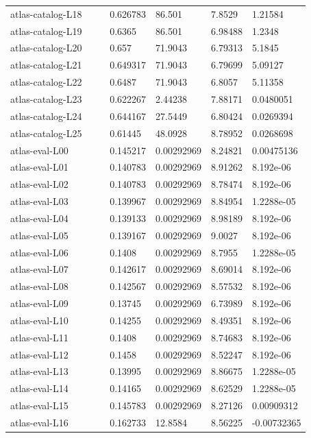 \begin{longtable}{@{}L{0.39\linewidth}L{0.11\linewidth}L{0.12\linewidth}L{0.12\linewidth}L{0.13\linewidth}@{}}
atlas-catalog-L18 & 0.626783 & 86.501 & 7.8529 & 1.21584 \\
atlas-catalog-L19 & 0.6365 & 86.501 & 6.98488 & 1.2348 \\
atlas-catalog-L20 & 0.657 & 71.9043 & 6.79313 & 5.1845 \\
atlas-catalog-L21 & 0.649317 & 71.9043 & 6.79699 & 5.09127 \\
atlas-catalog-L22 & 0.6487 & 71.9043 & 6.8057 & 5.11358 \\
atlas-catalog-L23 & 0.622267 & 2.44238 & 7.88171 & 0.0480051 \\
atlas-catalog-L24 & 0.644167 & 27.5449 & 6.80424 & 0.0269394 \\
atlas-catalog-L25 & 0.61445 & 48.0928 & 8.78952 & 0.0268698 \\
atlas-eval-L00 & 0.145217 & 0.00292969 & 8.24821 & 0.00475136 \\
atlas-eval-L01 & 0.140783 & 0.00292969 & 8.91262 & \mbox{8.192e-06} \\
atlas-eval-L02 & 0.140783 & 0.00292969 & 8.78474 & \mbox{8.192e-06} \\
atlas-eval-L03 & 0.139967 & 0.00292969 & 8.84954 & \mbox{1.2288e-05} \\
atlas-eval-L04 & 0.139133 & 0.00292969 & 8.98189 & \mbox{8.192e-06} \\
atlas-eval-L05 & 0.139167 & 0.00292969 & 9.0027 & \mbox{8.192e-06} \\
atlas-eval-L06 & 0.1408 & 0.00292969 & 8.7955 & \mbox{1.2288e-05} \\
atlas-eval-L07 & 0.142617 & 0.00292969 & 8.69014 & \mbox{8.192e-06} \\
atlas-eval-L08 & 0.142567 & 0.00292969 & 8.57532 & \mbox{8.192e-06} \\
atlas-eval-L09 & 0.13745 & 0.00292969 & 6.73989 & \mbox{8.192e-06} \\
atlas-eval-L10 & 0.14255 & 0.00292969 & 8.49351 & \mbox{8.192e-06} \\
atlas-eval-L11 & 0.1408 & 0.00292969 & 8.74683 & \mbox{8.192e-06} \\
atlas-eval-L12 & 0.1458 & 0.00292969 & 8.52247 & \mbox{8.192e-06} \\
atlas-eval-L13 & 0.13995 & 0.00292969 & 8.86675 & \mbox{1.2288e-05} \\
atlas-eval-L14 & 0.14165 & 0.00292969 & 8.62529 & \mbox{1.2288e-05} \\
atlas-eval-L15 & 0.145783 & 0.00292969 & 8.27126 & 0.00909312 \\
atlas-eval-L16 & 0.162733 & 12.8584 & 8.56225 & -0.00732365 \\

\end{longtable}
